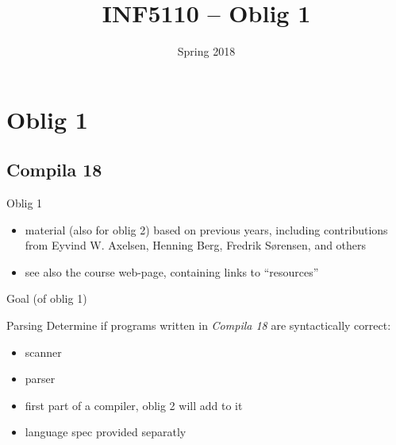 \documentclass{beamer}
\date{Spring 2018}
\title{INF5110 -- Oblig 1}
\renewcommand{\maketitle}{}
\begin{document}
\maketitle
\chapter{Oblig 1}
\label{sec:org1292f40}



\section{Compila 18}
\label{sec:org50c56c4}

\begin{frame}[label={sec:orgbe9e676}]{Oblig 1}
\begin{itemize}
\item material (also for oblig 2) based on previous years, including contributions from Eyvind
W. Axelsen, Henning Berg, Fredrik Sørensen, and others
\end{itemize}


\begin{itemize}
\item see also the course web-page, containing links to ``resources''
\end{itemize}
\end{frame}


\begin{frame}[label={sec:org2e91fd9}]{Goal (of oblig 1)}
\begin{block}{Parsing}
Determine if programs written in \emph{Compila 18} are syntactically correct: 

\begin{itemize}
\item scanner
\item parser
\end{itemize}
\end{block}


\begin{itemize}
\item first part of a compiler, oblig 2 will add to it
\item language spec provided separatly
\end{itemize}
\end{frame}
\end{document}
